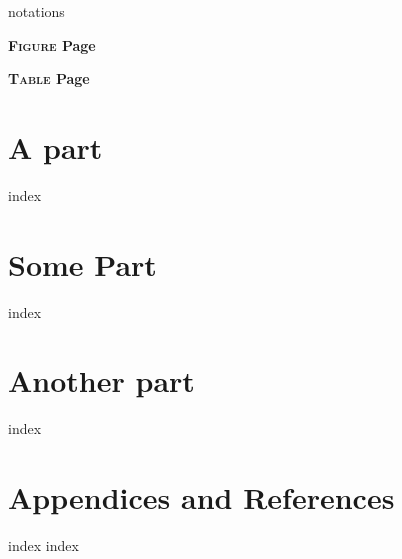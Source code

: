 \documentclass[a4paper,12pt,leqno,openbib]{memoir}
\begin{document}
\frontmatter
{}




\utsclearemptydoublepage
 \utsclearemptydoublepage
 \utsclearemptydoublepage
 \utsclearemptydoublepage
 \utsclearemptydoublepage
 \utsclearemptydoublepage

\renewcommand{\contentsname}{Table of Contents}
\tableofcontents*
\printglossary[type=\acronymtype, title=List of Abbreviations, toctitle=List of Abbreviations]
\utsclearemptydoublepage

{notations}
\utsclearemptydoublepage

\listoffigures
{}
{\par\nobreak\textbf{{\scshape Figure} \hfill Page}\par\nobreak}
\utsclearemptydoublepage

\listoftables
{}
{\par\nobreak\textbf{{\scshape Table} \hfill Page}\par\nobreak}
\utsclearemptydoublepage

\mainmatter

\part{A part}
{index} 
\utsclearemptydoublepage

\part{Some Part}
{index} 
\utsclearemptydoublepage

\part{Another part}
{index}
\utsclearemptydoublepage

\part{Appendices and References}
\appendix
{index} 
\utsclearemptydoublepage
{index} 
\utsclearemptydoublepage

\backmatter
{}

 
\utsclearemptydoublepage
\end{document}
